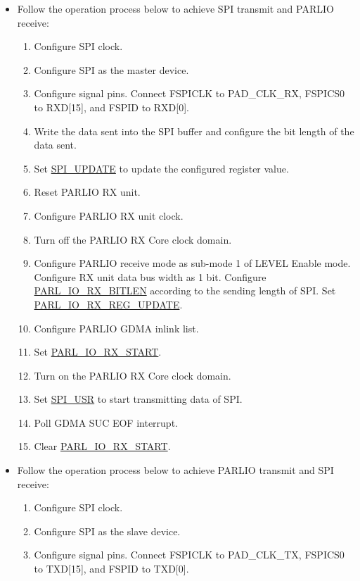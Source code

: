 \documentclass[main\_\_EN.tex]{subfiles}
\begin{document}
\begin{itemize}
    \item Follow the operation process below to achieve SPI transmit and PARLIO receive:
    \begin{enumerate}
        \item Configure SPI clock.
        \item Configure SPI as the master device.
        \item Configure signal pins. Connect FSPICLK to PAD\_CLK\_RX, FSPICS0 to RXD[15], and FSPID to RXD[0].
        \item Write the data sent into the SPI buffer and configure the bit length of the data sent.
        \item Set \hyperref[fielddesc:SPIUPDATE]{SPI\_UPDATE} to update the configured register value.
        \item Reset PARLIO RX unit.
        \item Configure PARLIO RX unit clock.
        \item Turn off the PARLIO RX Core clock domain.
        \item Configure PARLIO receive mode as sub-mode 1 of LEVEL Enable mode. Configure RX unit data bus width as 1 bit. Configure \hyperref[fielddesc:PARLIORXBITLEN]{PARL\_IO\_RX\_BITLEN} according to the sending length of SPI. Set \hyperref[fielddesc:PARLIORXREGUPDATE]{PARL\_IO\_RX\_REG\_UPDATE}.
        \item Configure PARLIO GDMA inlink list.
        \item Set \hyperref[fielddesc:PARLIORXSTART]{PARL\_IO\_RX\_START}.
        \item Turn on the PARLIO RX Core clock domain.
        \item Set \hyperref[fielddesc:SPIUSR]{SPI\_USR} to start transmitting data of SPI.
        \item Poll GDMA SUC EOF interrupt.
        \item Clear \hyperref[fielddesc:PARLIORXSTART]{PARL\_IO\_RX\_START}.
    \end{enumerate}
    \item Follow the operation process below to achieve PARLIO transmit and SPI receive:
    \begin{enumerate}
        \item Configure SPI clock.
        \item Configure SPI as the slave device.
        \item Configure signal pins. Connect FSPICLK to PAD\_CLK\_TX, FSPICS0 to TXD[15], and FSPID to TXD[0].

\end{enumerate}
\end{itemize}
\end{document}
